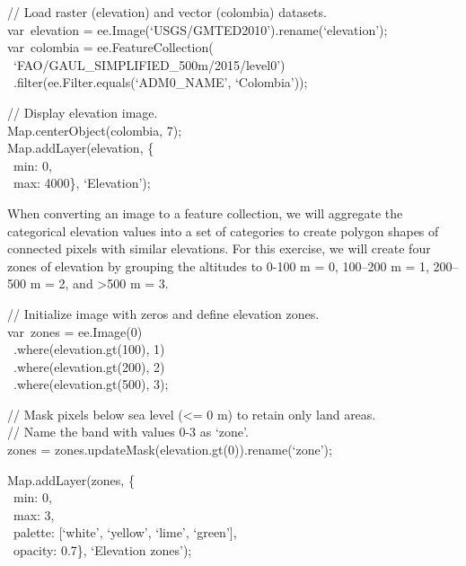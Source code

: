 \documentclass[
  letterpaper,
  DIV=11,
  numbers=noendperiod]{scrreprt}
\begin{document}
// Load raster (elevation) and vector (colombia) datasets.\\
var~elevation = ee.Image(`USGS/GMTED2010').rename(`elevation');\\
var~colombia = ee.FeatureCollection(~ ~ ~
~`FAO/GAUL\_SIMPLIFIED\_500m/2015/level0')\\
\hspace*{0.333em} ~.filter(ee.Filter.equals(`ADM0\_NAME', `Colombia'));

// Display elevation image.\\
Map.centerObject(colombia, 7);\\
Map.addLayer(elevation, \{\\
\hspace*{0.333em} ~min: 0,\\
\hspace*{0.333em} ~max: 4000\}, `Elevation');

When converting an image to a feature collection, we will aggregate the
categorical elevation values into a set of categories to create polygon
shapes of connected pixels with similar elevations. For this exercise,
we will create four zones of elevation by grouping the altitudes to
0-100 m = 0, 100--200 m = 1, 200--500 m = 2, and \textgreater500 m = 3.

// Initialize image with zeros and define elevation zones.\\
var~zones = ee.Image(0)\\
\hspace*{0.333em} ~.where(elevation.gt(100), 1)\\
\hspace*{0.333em} ~.where(elevation.gt(200), 2)\\
\hspace*{0.333em} ~.where(elevation.gt(500), 3);

// Mask pixels below sea level (\textless= 0 m) to retain only land
areas.\\
// Name the band with values 0-3 as `zone'.\\
zones = zones.updateMask(elevation.gt(0)).rename(`zone');

Map.addLayer(zones, \{\\
\hspace*{0.333em} ~min: 0,\\
\hspace*{0.333em} ~max: 3,\\
\hspace*{0.333em} ~palette: {[}`white', `yellow', `lime', `green'{]},\\
\hspace*{0.333em} ~opacity: 0.7\}, `Elevation zones');
\end{document}
